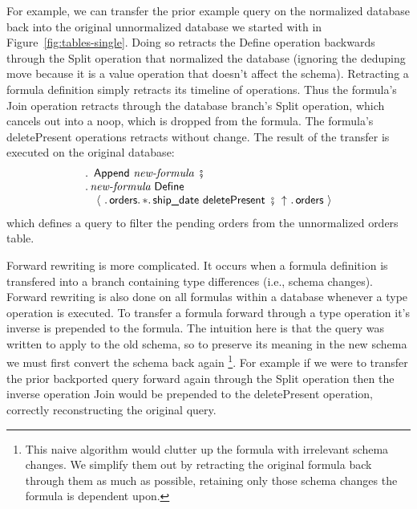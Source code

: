 \documentclass[english,submission]{programming}
\theoremstyle{definition}
\DeclareMathOperator{\exec}{\ \fatsemi\ \ }
\begin{document}
For example, we can transfer the prior example query on the normalized database back into the original unnormalized database we started with in Figure~\ref{fig:tables-single}. Doing so retracts the \textsf{Define} operation backwards through the \textsf{Split} operation that normalized the database (ignoring the deduping \textsf{move} because it is a value operation that doesn't affect the schema). Retracting a formula definition simply retracts its timeline of operations. Thus the formula's \textsf{Join} operation retracts through the database branch's \textsf{Split} operation, which cancels out into a \textsf{noop}, which is dropped from the formula. The formula's \textsf{deletePresent} operations retracts without change. The result of the transfer is executed on the original database:
\[
\begin{array}{l}
  \ldotp \textsf{ Append } \textit{new-formula} \exec\\
  \ldotp \textit{new-formula} \textsf{ Define } \\
  \quad \langle
\ \ldotp \textsf{orders}\ldotp * \ldotp \textsf{ship\_date deletePresent} \exec
\!\!\uparrow \ \ldotp \textsf{orders}\
  \rangle\\
\end{array}
\]
which defines a query to filter the pending orders from the unnormalized orders table.

Forward rewriting is more complicated. It occurs when a formula definition is transfered into a branch containing type differences (i.e., schema changes). Forward rewriting is also done on all formulas within a database whenever a type operation is executed. To transfer a formula forward through a type operation it's inverse is prepended to the formula. The intuition here is that the query was written to apply to the old schema, so to preserve its meaning in the new schema we must first convert the schema back again
\footnote{This naive algorithm would clutter up the formula with irrelevant schema changes. We simplify them out by retracting the original formula back through them as much as possible, retaining only those schema changes the formula is dependent upon.}.
For example if we were to transfer the prior backported query forward again through the \textsf{Split} operation then the inverse operation \textsf{Join} would be prepended to the \textsf{deletePresent} operation, correctly reconstructing the original query.


\end{document}
